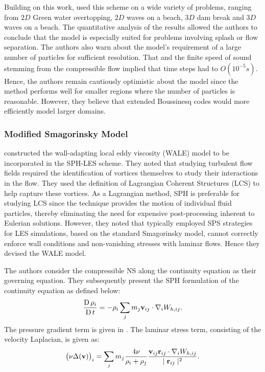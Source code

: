 Building on this work, \cite{Dalrymple2006} used this scheme on a wide variety of problems, ranging from $2D$ Green water overtopping, $2D$ waves on a beach, $3D$ dam break and $3D$ waves on a beach. The quantitative analysis of the results allowed the authors to conclude that the model is especially suited for problems involving splash or flow separation. The authors also warn about the model’s requirement of a large number of particles for sufficient resolution. That and the finite speed of sound stemming from the compressible flow implied that time steps had to $O(10^{-5}s)$. Hence, the authors remain cautiously optimistic about the model since the method performs well for smaller regions where the number of particles is reasonable. However, they believe that extended Boussinesq codes would more efficiently model larger domains.

\subsubsection{Modified Smagorinsky Model}
\label{sec:Modified-Smagorinsky-Model}
\cite{Canelas2016} constructed the wall-adapting local eddy viscosity (WALE) model to be incorporated in the SPH-LES scheme. They noted that studying turbulent flow fields required the identification of vortices themselves to study their interactions in the flow. They used the definition of Lagrangian Coherent Structures (LCS) to help capture these vortices. As a Lagrangian method, SPH is preferable for studying LCS since the technique provides the motion of individual fluid particles, thereby eliminating the need for expensive post-processing inherent to Eulerian solutions. 
However, they noted that typically employed SPS strategies for LES simulations, based on the standard Smagorinsky model, cannot correctly enforce wall conditions and non-vanishing stresses with laminar flows. Hence they devised the WALE model.

The authors consider the compressible NS along the continuity equation as their governing equation. They subsequently present the SPH formulation of the continuity equation as defined below:
\begin{equation}
    \frac{\operatorname{D} \rho_i}{\operatorname{D} t} = - \rho_i \sum_j m_j \mathbf{v}_{ij} \cdot \nabla_{i} W_{h, ij}.
    \label{eq:Canelas2016-continuity-sph}
\end{equation}
The pressure gradient term is given in . The laminar stress term, consisting of the velocity Laplacian, is given as:
\begin{equation}
    \big(\nu \Delta(\mathbf{v}) \big)_i = \sum_j m_j \frac{4 \nu}{\rho_i + \rho_j}\frac{\mathbf{v}_{ij} \mathbf{r}_{ij} \cdot \nabla_{i} W_{h, ij}}{\mid \mathbf{r}_{ij} \mid^{2}}.
    \label{eq:Canelas2016-vel-laplacian-sph}
\end{equation}

